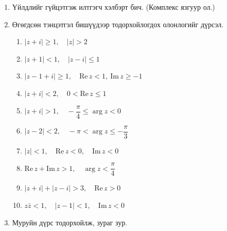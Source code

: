 \begin{enumerate}
\item Үйлдлийг гүйцэтгэж илтгэгч хэлбэрт бич. (Комплекс язгуур ол.)
\begin{enumerate}
\end{enumerate}
\item Өгөгдсөн тэнцэтгэл бишүүдээр тодорхойлогдох олонлогийг дүрсэл.
\begin{enumerate}
\item $|z+i|\ge 1,\quad |z|>2$
\item $|z+1|<1,\quad |z-i|\le 1$
\item $|z-1+i|\ge 1,\quad \mathrm{Re}\,z<1,\ \mathrm{Im}\,z\ge -1$
\item $|z+i|<2,\quad 0<\mathrm{Re}\,z\le 1$
\item $|z+i|>1,\quad -\dfrac{\pi}{4}\le \arg z<0$
\item $|z-2|<2,\quad -\pi<\arg z\le -\dfrac{\pi}{3}$
\item $|z|<1,\quad \mathrm{Re}\,z<0,\quad \mathrm{Im}\,z<0$
\item $\mathrm{Re}\,z+\mathrm{Im}\,z>1,\quad \arg z<\dfrac{\pi}{4}$
\item $|z+i|+|z-i|>3,\quad \mathrm{Re}\,z>0$
\item $z\bar z<1,\quad |z-1|<1,\quad \mathrm{Im}\,z<0$
\end{enumerate}
\item Муруйн дүрс тодорхойлж, зураг зур.
\begin{enumerate}
\end{enumerate}
\end{enumerate}